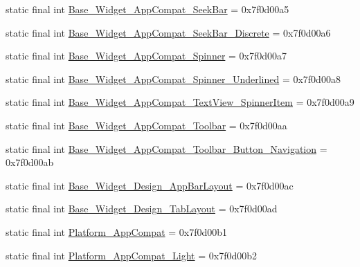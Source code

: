 \begin{DoxyCompactItemize}
\item 
static final int \mbox{\hyperlink{classandroid_1_1support_1_1design_1_1R_1_1style_a4da6bd27a198f591c6b7570a8394278c}{Base\+\_\+\+Widget\+\_\+\+App\+Compat\+\_\+\+Seek\+Bar}} = 0x7f0d00a5
\item 
static final int \mbox{\hyperlink{classandroid_1_1support_1_1design_1_1R_1_1style_a857ec0e91e96006f5c182d7bbcfd9dd7}{Base\+\_\+\+Widget\+\_\+\+App\+Compat\+\_\+\+Seek\+Bar\+\_\+\+Discrete}} = 0x7f0d00a6
\item 
static final int \mbox{\hyperlink{classandroid_1_1support_1_1design_1_1R_1_1style_a2984eaba42ecd51a2ba4c50d4fc4d532}{Base\+\_\+\+Widget\+\_\+\+App\+Compat\+\_\+\+Spinner}} = 0x7f0d00a7
\item 
static final int \mbox{\hyperlink{classandroid_1_1support_1_1design_1_1R_1_1style_aeea6f9131a92e96a6130437765238642}{Base\+\_\+\+Widget\+\_\+\+App\+Compat\+\_\+\+Spinner\+\_\+\+Underlined}} = 0x7f0d00a8
\item 
static final int \mbox{\hyperlink{classandroid_1_1support_1_1design_1_1R_1_1style_a7682f5a21cba08ffd067009c829c4e14}{Base\+\_\+\+Widget\+\_\+\+App\+Compat\+\_\+\+Text\+View\+\_\+\+Spinner\+Item}} = 0x7f0d00a9
\item 
static final int \mbox{\hyperlink{classandroid_1_1support_1_1design_1_1R_1_1style_a288f7bda20a0a4f6422a8a02ebb0e945}{Base\+\_\+\+Widget\+\_\+\+App\+Compat\+\_\+\+Toolbar}} = 0x7f0d00aa
\item 
static final int \mbox{\hyperlink{classandroid_1_1support_1_1design_1_1R_1_1style_ab13628e7e74bf48ac4e618287e6bff4e}{Base\+\_\+\+Widget\+\_\+\+App\+Compat\+\_\+\+Toolbar\+\_\+\+Button\+\_\+\+Navigation}} = 0x7f0d00ab
\item 
static final int \mbox{\hyperlink{classandroid_1_1support_1_1design_1_1R_1_1style_a1d4fa19f851634c2d7df19f13ed32d06}{Base\+\_\+\+Widget\+\_\+\+Design\+\_\+\+App\+Bar\+Layout}} = 0x7f0d00ac
\item 
static final int \mbox{\hyperlink{classandroid_1_1support_1_1design_1_1R_1_1style_a45452ddaf6cb0ff3c1fba11ccaa82526}{Base\+\_\+\+Widget\+\_\+\+Design\+\_\+\+Tab\+Layout}} = 0x7f0d00ad
\item 
static final int \mbox{\hyperlink{classandroid_1_1support_1_1design_1_1R_1_1style_a5be61a46aa87257526f21945abcb1e6a}{Platform\+\_\+\+App\+Compat}} = 0x7f0d00b1
\item 
static final int \mbox{\hyperlink{classandroid_1_1support_1_1design_1_1R_1_1style_af1cc29433f47e8f74d2b4a99ca31bf2e}{Platform\+\_\+\+App\+Compat\+\_\+\+Light}} = 0x7f0d00b2

\end{DoxyCompactItemize}
